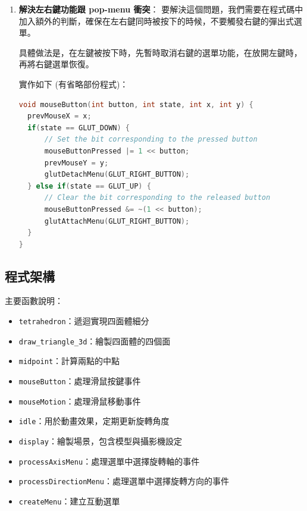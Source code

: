 \documentclass[12pt,a4paper]{article}
\begin{document}
\begin{enumerate}
\begin{lstlisting}[language=C++,breaklines=true]
        if(phi <= 0.01f) phi = 0.01f;
        if(phi >= 3.13f) phi = 3.13f;
    }

    if(
      (mouseButtonPressed & (1 << GLUT_LEFT_BUTTON)) != 0 &&
      (mouseButtonPressed & (1 << GLUT_RIGHT_BUTTON)) != 0
    ) 
    {
      radius += dy * 0.01f;

      if(radius < 1.0f) radius = 1.0f;
      if(radius > 10.0f) radius = 10.0f;
    }

    prevMouseX = x;
    prevMouseY = y;

    glutPostRedisplay(); 
}

  \end{lstlisting}
  \newpage
  \item \textbf{解決左右鍵功能跟 pop-menu 衝突}：
    要解決這個問題，我們需要在程式碼中加入額外的判斷，確保在左右鍵同時被按下的時候，不要觸發右鍵的彈出式選單。
    
    具體做法是，在左鍵被按下時，先暫時取消右鍵的選單功能，在放開左鍵時，再將右鍵選單恢復。
    
    實作如下 (有省略部份程式)：
    \begin{lstlisting}[language=C++,breaklines=true]
void mouseButton(int button, int state, int x, int y) {
  prevMouseX = x;
  if(state == GLUT_DOWN) {
      // Set the bit corresponding to the pressed button
      mouseButtonPressed |= 1 << button;
      prevMouseY = y;
      glutDetachMenu(GLUT_RIGHT_BUTTON);
  } else if(state == GLUT_UP) {
      // Clear the bit corresponding to the released button
      mouseButtonPressed &= ~(1 << button);
      glutAttachMenu(GLUT_RIGHT_BUTTON);
  }
}
  \end{lstlisting}


\end{enumerate}
\newpage
\subsection*{程式架構}
\noindent 主要函數說明：
\begin{itemize}
\item \texttt{tetrahedron}：遞迴實現四面體細分
\item \texttt{draw\_triangle\_3d}：繪製四面體的四個面
\item \texttt{midpoint}：計算兩點的中點
\item \texttt{mouseButton}：處理滑鼠按鍵事件
\item \texttt{mouseMotion}：處理滑鼠移動事件
\item \texttt{idle}：用於動畫效果，定期更新旋轉角度
\item \texttt{display}：繪製場景，包含模型與攝影機設定
\item \texttt{processAxisMenu}：處理選單中選擇旋轉軸的事件
\item \texttt{processDirectionMenu}：處理選單中選擇旋轉方向的事件
\item \texttt{createMenu}：建立互動選單
\end{itemize}
\end{document}
